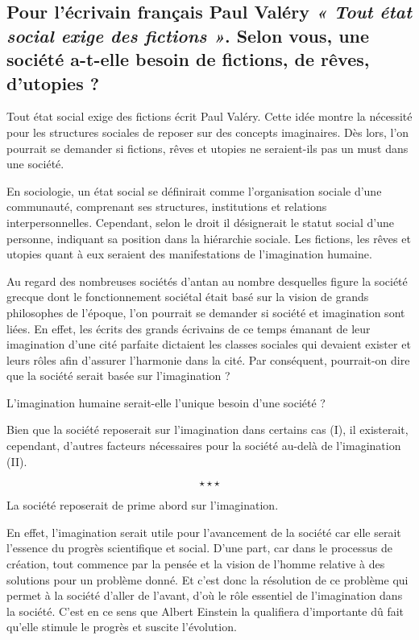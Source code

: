 \begin{center}
	\subsection*{Pour l’écrivain français Paul Valéry \textit{« Tout état social exige des fictions »}.  Selon vous, une société a-t-elle besoin de fictions, de rêves, d’utopies ? }
\end{center}

Tout état social exige des fictions écrit Paul Valéry. Cette idée montre la nécessité pour les structures sociales de reposer sur des concepts imaginaires. Dès lors, l'on pourrait se demander si fictions, rêves et utopies ne seraient-ils pas un must dans une société.

En sociologie, un état social se définirait comme l'organisation sociale d'une communauté, comprenant ses structures, institutions et relations interpersonnelles. Cependant, selon le droit il désignerait le statut social d'une personne, indiquant sa position dans la hiérarchie sociale. Les fictions, les rêves et utopies quant à eux seraient des manifestations de l'imagination humaine. 

Au regard des nombreuses sociétés d'antan au nombre desquelles figure la société grecque dont le fonctionnement sociétal était basé sur la vision de grands philosophes de l'époque, l'on pourrait se demander si société et imagination sont liées. En effet, les écrits des grands écrivains de ce temps émanant de leur imagination d'une cité parfaite dictaient les classes sociales qui devaient exister et leurs rôles afin d'assurer l'harmonie dans la cité. Par conséquent, pourrait-on dire que la société serait basée sur l'imagination ?

L'imagination humaine serait-elle l'unique besoin d'une société ?

Bien que la société reposerait sur l'imagination dans certains cas (I), il existerait, cependant, d'autres facteurs nécessaires pour la société au-delà de l'imagination (II).

$$\star \star \star$$

La société reposerait de prime abord sur l'imagination. 

En effet, l'imagination serait utile pour l'avancement de la société car elle serait l'essence du progrès scientifique et social. D'une part, car dans le processus de création, tout commence par la pensée et la vision de l'homme relative à des solutions pour un problème donné. Et c'est donc la résolution de ce problème qui permet à la société d'aller de l'avant, d'où le rôle essentiel de l'imagination dans la société. C'est en ce sens que Albert Einstein la qualifiera d'importante dû fait qu'elle stimule le progrès et suscite l'évolution.

